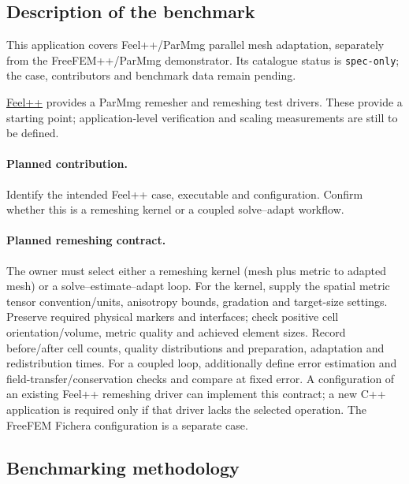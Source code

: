 \label{sec:app:specs:app-feelpp-parmmg}



\subsection{Description of the benchmark}
This application covers Feel++/ParMmg parallel mesh adaptation, separately
from the FreeFEM++/ParMmg demonstrator. Its catalogue status is
\texttt{spec-only}; the case, contributors and benchmark data remain pending.

\href{https://github.com/feelpp/feelpp}{Feel++} provides a ParMmg remesher and
remeshing test drivers. These provide a starting point; application-level
verification and scaling measurements are still to be defined.

\paragraph{Planned contribution.} Identify the intended Feel++ case,
executable and configuration. Confirm whether this is a remeshing kernel or
a coupled solve--adapt workflow.


\paragraph{Planned remeshing contract.}
The owner must select either a remeshing kernel (mesh plus metric to adapted
mesh) or a solve--estimate--adapt loop. For the kernel, supply the spatial
metric tensor convention/units, anisotropy bounds, gradation and target-size
settings. Preserve required physical markers and interfaces; check positive
cell orientation/volume, metric quality and achieved element sizes. Record
before/after cell counts, quality distributions and preparation, adaptation
and redistribution times. For a coupled loop, additionally define error
estimation and field-transfer/conservation checks and compare at fixed error.
A configuration of an existing Feel++ remeshing driver can implement this
contract; a new C++ application is required only if that driver lacks the
selected operation. The FreeFEM Fichera configuration is a separate case.

\subsection{Benchmarking methodology}
